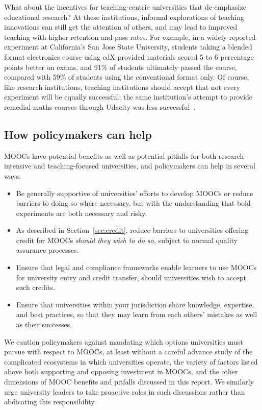 What about the incentives for teaching-centric universities that
de-emphasize educational research?
At these institutions, informal explorations of teaching innovations
can still get the attention of others, and may lead to improved
teaching with higher retention and pass rates.  For example, in a widely
reported experiment at California's San Jose State University, students
taking a blended format electronics course using edX-provided materials
scored 5 to 6 percentage points better on exams, and 91\% of students
ultimately passed the course, compared with 59\% of students using the
conventional format only.  Of course, like research institutions,
teaching institutions should accept that not every experiment will be
equally successful: the same institution's attempt to provide remedial
maths courses through Udacity was less successful~\cite{cheal-sjsu-moocs}.

 
\subsection{How policymakers can help} 

MOOCs have potential benefits as
well as potential pitfalls for both research-intensive and
teaching-focused universities, and policymakers can help in several
ways:



\begin{itemize}

\item Be generally supportive of universities' efforts to develop MOOCs
  or reduce barriers 
to doing so where necessary, but with the understanding that bold
experiments are both necessary and risky.

\item As described in Section~\ref{sec:credit}, reduce barriers to
  universities offering credit for 
MOOCs \emph{should they wish to do so,} subject to normal quality assurance
processes.

\item Ensure that legal and compliance frameworks enable
  learners to use MOOCs for university entry and credit transfer, should
  universities wish to accept such credits.

\item Ensure that universities within your jurisdiction share knowledge,
expertise, and best practices, so that they may learn from each
others' mistakes as well as their successes.

\end{itemize}

We caution policymakers against mandating which options universities
must pursue with respect to MOOCs, at least without a careful advance
study of the complicated ecosystems in which universities operate,
the variety of factors listed above both supporting and opposing investment in
MOOCs, and the other dimensions of MOOC benefits and pitfalls discussed in this
report.  We similarly urge university leaders to take proactive roles in
such discussions rather than abdicating this responsibility.

